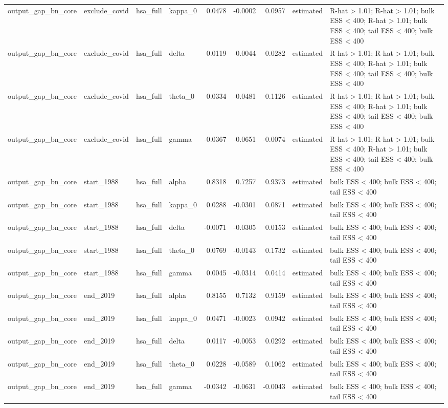 \begin{tabular}{llllrrrll}
output\_gap\_bn\_core & exclude\_covid & hsa\_full & kappa\_0 & 0.0478 & -0.0002 & 0.0957 & estimated & R-hat > 1.01; R-hat > 1.01; bulk ESS < 400; R-hat > 1.01; bulk ESS < 400; tail ESS < 400; bulk ESS < 400 \\
output\_gap\_bn\_core & exclude\_covid & hsa\_full & delta & 0.0119 & -0.0044 & 0.0282 & estimated & R-hat > 1.01; R-hat > 1.01; bulk ESS < 400; R-hat > 1.01; bulk ESS < 400; tail ESS < 400; bulk ESS < 400 \\
output\_gap\_bn\_core & exclude\_covid & hsa\_full & theta\_0 & 0.0334 & -0.0481 & 0.1126 & estimated & R-hat > 1.01; R-hat > 1.01; bulk ESS < 400; R-hat > 1.01; bulk ESS < 400; tail ESS < 400; bulk ESS < 400 \\
output\_gap\_bn\_core & exclude\_covid & hsa\_full & gamma & -0.0367 & -0.0651 & -0.0074 & estimated & R-hat > 1.01; R-hat > 1.01; bulk ESS < 400; R-hat > 1.01; bulk ESS < 400; tail ESS < 400; bulk ESS < 400 \\
output\_gap\_bn\_core & start\_1988 & hsa\_full & alpha & 0.8318 & 0.7257 & 0.9373 & estimated & bulk ESS < 400; bulk ESS < 400; tail ESS < 400 \\
output\_gap\_bn\_core & start\_1988 & hsa\_full & kappa\_0 & 0.0288 & -0.0301 & 0.0871 & estimated & bulk ESS < 400; bulk ESS < 400; tail ESS < 400 \\
output\_gap\_bn\_core & start\_1988 & hsa\_full & delta & -0.0071 & -0.0305 & 0.0153 & estimated & bulk ESS < 400; bulk ESS < 400; tail ESS < 400 \\
output\_gap\_bn\_core & start\_1988 & hsa\_full & theta\_0 & 0.0769 & -0.0143 & 0.1732 & estimated & bulk ESS < 400; bulk ESS < 400; tail ESS < 400 \\
output\_gap\_bn\_core & start\_1988 & hsa\_full & gamma & 0.0045 & -0.0314 & 0.0414 & estimated & bulk ESS < 400; bulk ESS < 400; tail ESS < 400 \\
output\_gap\_bn\_core & end\_2019 & hsa\_full & alpha & 0.8155 & 0.7132 & 0.9159 & estimated & bulk ESS < 400; bulk ESS < 400; tail ESS < 400 \\
output\_gap\_bn\_core & end\_2019 & hsa\_full & kappa\_0 & 0.0471 & -0.0023 & 0.0942 & estimated & bulk ESS < 400; bulk ESS < 400; tail ESS < 400 \\
output\_gap\_bn\_core & end\_2019 & hsa\_full & delta & 0.0117 & -0.0053 & 0.0292 & estimated & bulk ESS < 400; bulk ESS < 400; tail ESS < 400 \\
output\_gap\_bn\_core & end\_2019 & hsa\_full & theta\_0 & 0.0228 & -0.0589 & 0.1062 & estimated & bulk ESS < 400; bulk ESS < 400; tail ESS < 400 \\
output\_gap\_bn\_core & end\_2019 & hsa\_full & gamma & -0.0342 & -0.0631 & -0.0043 & estimated & bulk ESS < 400; bulk ESS < 400; tail ESS < 400 \\
\bottomrule
\end{tabular}
